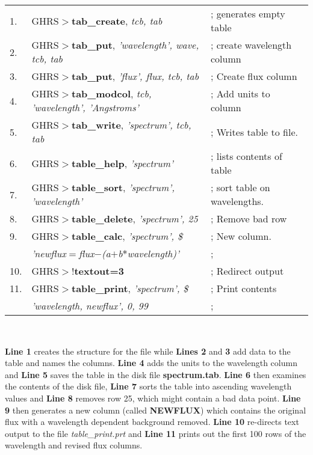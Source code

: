 \begin{small}
\begin{tabular}{lll}
1. & GHRS$>${\bf tab\_create}, {\it tcb, tab} & ; generates empty table \\
2. & GHRS$>${\bf tab\_put}, {\it 'wavelength', wave, tcb, tab} & ; create wavelength column \\
3. & GHRS$>${\bf tab\_put}, {\it 'flux', flux, tcb, tab} & ; Create flux column \\
4. & GHRS$>${\bf tab\_modcol}, {\it tcb, 'wavelength', 'Angstroms'} & ; Add units to column \\
5. & GHRS$>${\bf tab\_write}, {\it 'spectrum', tcb, tab} & ; Writes table to file. \\
6. & GHRS$>${\bf table\_help}, {\it 'spectrum'} & ; lists contents of table \\
7. & GHRS$>${\bf table\_sort}, {\it 'spectrum', 'wavelength'} & ; sort table on wavelengths. \\
8. & GHRS$>${\bf table\_delete}, {\it 'spectrum', 25} & ; Remove bad row \\
9. & GHRS$>${\bf table\_calc}, {\it 'spectrum', \$} & ; New column.\\
   & {\it 'newflux$=$flux$-$(a$+$b$*$wavelength)'} & ; \\
10. & GHRS$>${\bf $!$textout=3} & ; Redirect output \\
11. & GHRS$>${\bf table\_print}, {\it 'spectrum', \$} & ; Print contents \\
   & {\it 'wavelength, newflux', 0, 99} & ;\\ 
\end{tabular}\\
\end{small}

\noindent
{\bf Line 1} creates the structure for the file while {\bf Lines 2}
and {\bf 3} add data to the table and names the columns. {\bf Line 4}
adds the units to the wavelength column and {\bf Line 5} saves the
table in the disk file {\bf spectrum.tab}.  {\bf Line 6} then examines
the contents of the disk file, {\bf Line 7} sorts the table into
ascending wavelength values and {\bf Line 8} removes row 25, which
might contain a bad data point. {\bf Line 9} then generates a new
column (called {\bf NEWFLUX}) which contains the original flux with a
wavelength dependent background removed. {\bf Line 10} re-directs text
output to the file {\it table\_print.prt} and {\bf Line 11} prints out
the first 100 rows of the wavelength and revised flux columns. 



